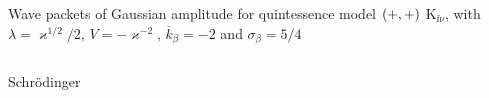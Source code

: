 \documentclass[8pt]{beamer}
\begin{document}
\begin{frame}%
{Wave packets of Gaussian amplitude for quintessence model ${\left(+,+\right)}$}%
{$\mathrm{K}_{\ii\nu}$, with $\lambda = \varkappa^{1/2}/2$,
$V = -\varkappa^{-2}$, $\overline{k}_\beta = -2$ and $\sigma_\beta = 5/4$}
\begin{columns}
\begin{column}{.49\textwidth}
\begin{block}{Schrödinger}

\end{block}
\end{column}
\end{columns}
\end{frame}
\end{document}
